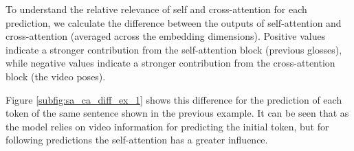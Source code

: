 To understand the relative relevance of self and cross-attention for each prediction, we calculate the difference between the outputs of self-attention and cross-attention (averaged across the embedding dimensions). Positive values indicate a stronger contribution from the self-attention block (previous glosses), while negative values indicate a stronger contribution from the cross-attention block (the video poses).

Figure \ref{subfig:sa_ca_diff_ex_1} shows this difference for the prediction of each token of the same sentence shown in the previous example. It can be seen that as the model relies on video information for predicting the initial token, but for following predictions the self-attention has a greater influence.
